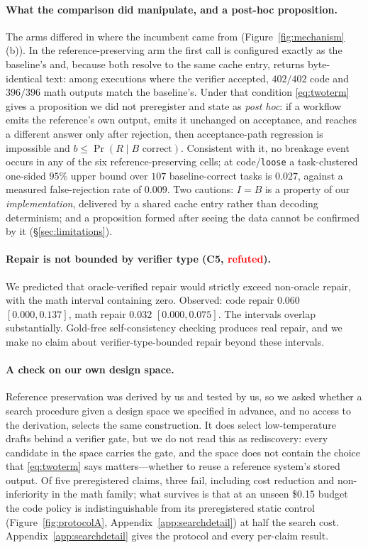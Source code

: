 \documentclass{article}
\newcommand{\brate}{b}
\begin{document}
\paragraph{What the comparison did manipulate, and a post-hoc proposition.} The
arms differed in where the incumbent came from (Figure~\ref{fig:mechanism}(b)).
In the reference-preserving arm the first call is configured exactly as the
baseline's and, because both resolve to the same cache entry, returns
byte-identical text: among executions where the verifier accepted, $402/402$ code
and $396/396$ math outputs match the baseline's. Under that condition
\eqref{eq:twoterm} gives a proposition we did not preregister and state as
\emph{post hoc}: if a workflow emits the reference's own output, emits it
unchanged on acceptance, and reaches a different answer only after rejection,
then acceptance-path regression is impossible and
$\brate \le \Pr(R \mid B\text{ correct})$. Consistent with it, no breakage event
occurs in any of the six reference-preserving cells; at code/\texttt{loose} a
task-clustered one-sided $95\%$ upper bound over $107$ baseline-correct tasks is
$0.027$, against a measured false-rejection rate of $0.009$. Two cautions: $I=B$
is a property of our \emph{implementation}, delivered by a shared cache entry
rather than decoding determinism; and a proposition formed after seeing the data
cannot be confirmed by it (\S\ref{sec:limitations}).

\paragraph{Repair is not bounded by verifier type (C5,
\textcolor{red}{refuted}).} We predicted that oracle-verified repair would
strictly exceed non-oracle repair, with the math interval containing zero.
Observed: code repair $0.060$ $[0.000,0.137]$, math repair $0.032$
$[0.000,0.075]$. The intervals overlap substantially. Gold-free self-consistency
checking produces real repair, and we make no claim about verifier-type-bounded
repair beyond these intervals.

\paragraph{A check on our own design space.} Reference preservation was derived
by us and tested by us, so we asked whether a search procedure given a design
space we specified in advance, and no access to the derivation, selects the same
construction. It does select low-temperature drafts behind a verifier gate, but
we do not read this as rediscovery: every candidate in the space carries the
gate, and the space does not contain the choice that \eqref{eq:twoterm} says
matters---whether to reuse a reference system's stored output. Of five
preregistered claims, three fail, including cost reduction and non-inferiority
in the math family; what survives is that at an unseen \$0.15 budget the code
policy is indistinguishable from its preregistered static control
(Figure~\ref{fig:protocolA}, Appendix~\ref{app:searchdetail}) at half the
search cost. Appendix~\ref{app:searchdetail} gives the protocol and every
per-claim result.
\end{document}
